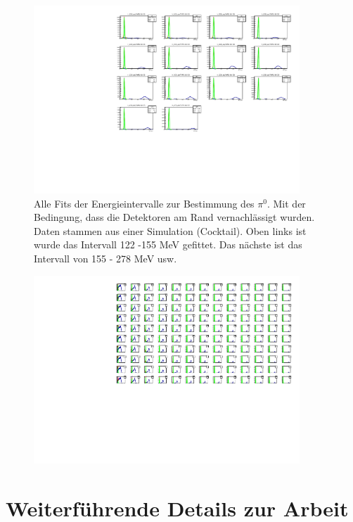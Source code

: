 \documentclass[a4paper,11pt,oneside,final,german,openbib,pdftex]{scrbook}
\begin{document}
\begin{appendix}
\begin{figure}
	\begin{center}
		\includegraphics[width=100mm]{30DegreeEdgeAllFits}
		\caption{Alle Fits der Energieintervalle zur Bestimmung des $\pi^0$. Mit der Bedingung, dass die Detektoren am Rand vernachl\"assigt wurden. Daten stammen aus einer Simulation (Cocktail). Oben links ist wurde das Intervall 122 -155 MeV gefittet. Das nächste ist das Intervall von 155 - 278 MeV usw.}
	\end{center}
\end{figure}


\begin{figure}
	\begin{center}
		\includegraphics[width=100mm]{FullZVertexDependenceAllFits}
	\end{center}
\end{figure}

\section{Weiterf\"uhrende Details zur Arbeit}


\end{appendix}
\end{document}
